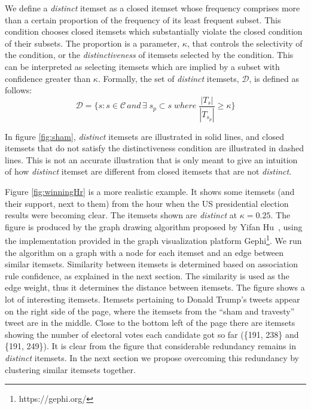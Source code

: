 \documentclass[letterpaper,12pt,titlepage,oneside,final]{book}
\begin{document}
We define a \emph{distinct} itemset as a closed itemset whose frequency
comprises more than a certain proportion of the frequency of its least
frequent subset. 
This condition chooses closed itemsets which substantially violate the closed
condition of their subsets.
The proportion is a parameter, $\kappa$, that controls the selectivity 
of the condition,
or the \emph{distinctiveness} of itemsets selected by the condition.
This can be interpreted as selecting itemsets which are implied by a subset
with confidence greater than $\kappa$.
Formally, the set of \emph{distinct} itemsets, $\mathcal{D}$,
is defined as follows:
\begin{equation}\mathcal{D} = \{s: s \in \mathcal{C} \, and \, \exists \; s_{p} \subset s \; where \; \frac{|T_{s}|}{|T_{s_{p}}|} \ge \kappa 
\}
\end{equation}


In figure \ref{fig:sham}, \emph{distinct} itemsets are illustrated in solid lines, 
and closed itemsets that do not satisfy the distinctiveness condition are illustrated in dashed lines.
This is not an accurate illustration that is only meant 
to give an intuition of how \emph{distinct} itemset are different from closed itemsets that are not \emph{distinct}.

Figure \ref{fig:winningHr} is a more realistic example.
It shows some itemsets (and their support, next to them) from the hour when 
the US presidential election results were becoming clear.
The itemsets shown are \emph{distinct} at $\kappa = 0.25$.
The figure is produced by the graph drawing algorithm proposed by Yifan Hu~\cite{hu2005efficient},
using the implementation provided 
in the graph visualization platform Gephi\footnote{https://gephi.org/}.
We run the algorithm on a graph with a node for each itemset and 
an edge between similar itemsets.
Similarity between itemsets
is determined based on 
association rule confidence,
as explained in the next section.
The similarity is used as the edge weight,
thus it determines the distance between itemsets.
The figure shows a lot of interesting itemsets.
Itemsets pertaining to Donald Trump's tweets appear on the right side of the page,
where the itemsets from the ``sham and travesty'' tweet are in the middle.
Close to the bottom left of the page there are itemsets showing the number
of electoral votes each candidate got so far (\{191, 238\} and \{191, 249\}). 
It is clear from the figure that considerable redundancy remains in
\emph{distinct} itemsets. 
In the next section we propose overcoming this redundancy 
by clustering similar itemsets together.
\end{document}
